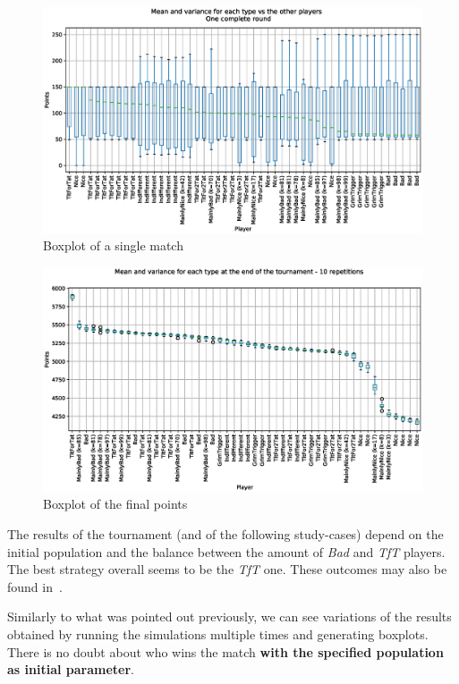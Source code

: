 \documentclass[journal,a4paper,10pt,twoside]{IEEEtran} %
\begin{document}
\begin{figure}[!ht]
    \centering
    \includegraphics[width=1\columnwidth]{../img/ipdmp/ipdmp-boxplot-single-match-50}
    \caption{Boxplot of a single match}
    \label{fig:boxIPDMPsingle}
\end{figure}

\begin{figure}[!ht]
    \centering
    \includegraphics[width=1\columnwidth]{../img/ipdmp/ipdmp-boxplot-final-points-50}
    \caption{Boxplot of the final points}
    \label{fig:boxIPDMPfinal}
\end{figure}

The results of the tournament (and of the following study-cases) depend on the initial population and the balance between the amount of \textit{Bad} and \textit{TfT} players. The best strategy overall seems to be the \textit{TfT} one.
These outcomes may also be found in~\cite{mathieu2017}.

Similarly to what was pointed out previously, we can see variations of the results obtained by running the simulations multiple times and generating boxplots. There is no doubt about who wins the match \textbf{with the specified population as initial parameter}.
\end{document}
